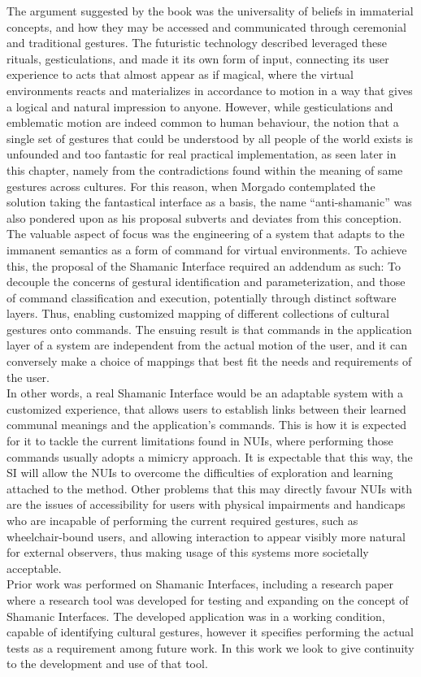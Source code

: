     The argument suggested by the book was the universality of beliefs in immaterial concepts, and how they may be accessed and communicated through ceremonial and traditional gestures. The futuristic technology described leveraged these rituals, gesticulations, and made it its own form of input, connecting its user experience to acts that almost appear as if magical, where the virtual environments reacts and materializes in accordance to motion in a way that gives a logical and natural impression to anyone. However, while gesticulations and emblematic motion are indeed common to human behaviour, the notion that a single set of gestures that could be understood by all people of the world exists is unfounded and too fantastic for real practical implementation, as seen later in this chapter, namely from the contradictions found within the meaning of same gestures across cultures. For this reason, when Morgado\cite{MOR2013} contemplated the solution taking the fantastical interface as a basis, the name “anti-shamanic” was also pondered upon as his proposal subverts and deviates from this conception.\\
    The valuable aspect of focus was the engineering of a system that adapts to the immanent semantics as a form of command for virtual environments. To achieve this, the proposal of the Shamanic Interface required an addendum as such: To decouple the concerns of gestural identification and parameterization, and those of command classification and execution, potentially through distinct software layers. Thus, enabling customized mapping of different collections of cultural gestures onto commands. The ensuing result is that commands in the application layer of a system are independent from the actual motion of the user, and it can conversely make a choice of mappings that best fit the needs and requirements of the user.\\ 
    In other words, a real Shamanic Interface would be an adaptable system with a customized experience, that allows users to establish links between their learned communal meanings and the application’s commands. This is how it is expected for it to tackle the current limitations found in NUIs, where performing those commands usually adopts a mimicry approach. It is expectable that this way, the SI will allow the NUIs to overcome the difficulties of exploration and learning attached to the method. Other problems that this may directly favour NUIs with are the issues of accessibility for users with physical impairments and handicaps who are incapable of performing the current required gestures, such as wheelchair-bound users, and allowing interaction to appear visibly more natural for external observers, thus making usage of this systems more societally acceptable.\\ 
    Prior work was performed on Shamanic Interfaces\cite{pinto2015}, including a research paper where a research tool was developed for testing and expanding on the concept of Shamanic Interfaces. The developed application was in a working condition, capable of identifying cultural gestures, however it specifies performing the actual tests as a requirement among future work. In this work we look to give continuity to the development and use of that tool.


